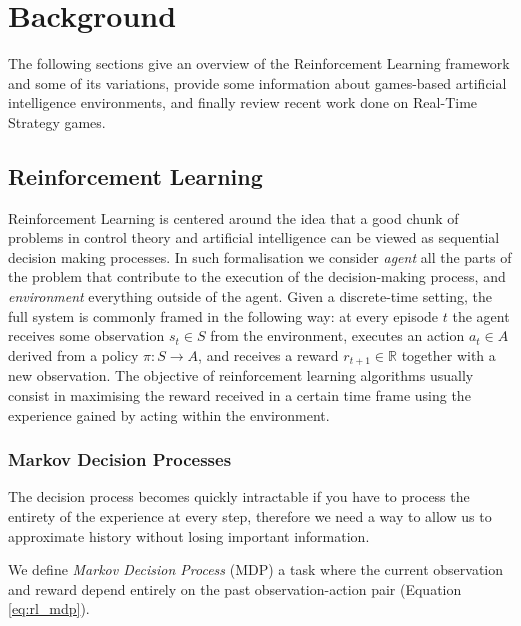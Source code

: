 

\chapter{Background}

The following sections give an overview of the Reinforcement Learning framework
and some of its variations, provide some information about games-based
artificial intelligence environments, and finally review recent work done on
Real-Time Strategy games.

\section{Reinforcement Learning}

Reinforcement Learning is centered around the idea that a good chunk of problems
in control theory and artificial intelligence can be viewed as sequential
decision making processes. In such formalisation we consider \emph{agent} all
the parts of the problem that contribute to the execution of the decision-making
process, and \emph{environment} everything outside of the agent.  Given a
discrete-time setting, the full system is commonly framed in the following way:
at every episode $t$ the agent receives some observation $s_t \in S$ from
the environment, executes an action $a_t \in A$ derived from a policy $\pi :
S \rightarrow A$, and receives a reward $r_{t+1} \in \mathbb{R}$ together with
a new observation. The objective
of reinforcement learning algorithms usually consist in maximising the reward
received in a certain time frame using the experience gained by acting within
the environment.

\subsection{Markov Decision Processes}

The decision process becomes quickly intractable if you have to process the
entirety of the experience at every step, therefore we need a way to allow us to
approximate history without losing important information.

We define \emph{Markov Decision Process} (MDP) a task where the current
observation and reward depend entirely on the past observation-action pair
(Equation \ref{eq:rl_mdp}).

